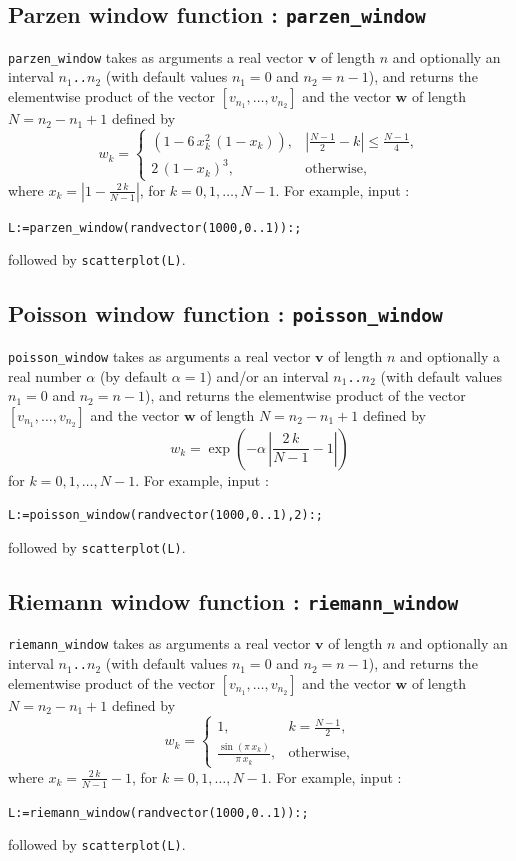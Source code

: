 \documentclass[a4paper,11pt]{book}
\begin{document}
\subsection{Parzen window function : {\tt parzen\_window}}
{\tt parzen\_window} takes as arguments a real vector $ \mathbf{v} $ of length $ n $ and optionally an interval $ n_1 ${\tt ..}$ n_2 $ (with default values $ n_1=0 $ and $ n_2=n-1 $), and returns the elementwise product of the vector $ [v_{n_1},\dots,v_{n_2}] $ and the vector $ \mathbf{w} $ of length $ N=n_2-n_1+1 $ defined by
\[ w_k=\begin{cases}
\left(1-6\,x_k^2\,\left(1-x_k\right)\right),&\left|\frac{N-1}{2}-k\right|\leq\frac{N-1}{4},\\
2\,\left(1-x_k\right)^3,&\text{otherwise},
\end{cases} \]
where $ x_k=\left|1-\frac{2\,k}{N-1}\right| $, for $ k=0,1,\dots,N-1 $. For example, input :
\begin{center}
	{\tt L:=parzen\_window(randvector(1000,0..1)):;}
\end{center}
followed by {\tt scatterplot(L)}.

\subsection{Poisson window function : {\tt poisson\_window}}
{\tt poisson\_window} takes as arguments a real vector $ \mathbf{v} $ of length $ n $ and optionally a real number $ \alpha $ (by default $ \alpha=1 $) and/or an interval $ n_1 ${\tt ..}$ n_2 $ (with default values $ n_1=0 $ and $ n_2=n-1 $), and returns the elementwise product of the vector $ [v_{n_1},\dots,v_{n_2}] $ and the vector $ \mathbf{w} $ of length $ N=n_2-n_1+1 $ defined by
\[ w_k=\exp\left(-\alpha\,\left|\frac{2\,k}{N-1}-1\right|\right) \]
for $ k=0,1,\dots,N-1 $. For example, input :
\begin{center}
	{\tt L:=poisson\_window(randvector(1000,0..1),2):;}
\end{center}
followed by {\tt scatterplot(L)}.

\subsection{Riemann window function : {\tt riemann\_window}}
{\tt riemann\_window} takes as arguments a real vector $ \mathbf{v} $ of length $ n $ and optionally an interval $ n_1 ${\tt ..}$ n_2 $ (with default values $ n_1=0 $ and $ n_2=n-1 $), and returns the elementwise product of the vector $ [v_{n_1},\dots,v_{n_2}] $ and the vector $ \mathbf{w} $ of length $ N=n_2-n_1+1 $ defined by
\[ w_k=\begin{cases}
1,&k=\frac{N-1}{2},\\
\frac{\sin(\pi\,x_k)}{\pi\,x_k},&\text{otherwise},
\end{cases} \]
where $ x_k=\frac{2\,k}{N-1}-1 $, for $ k=0,1,\dots,N-1 $. For example, input :
\begin{center}
	{\tt L:=riemann\_window(randvector(1000,0..1)):;}
\end{center}
followed by {\tt scatterplot(L)}.
\end{document}
